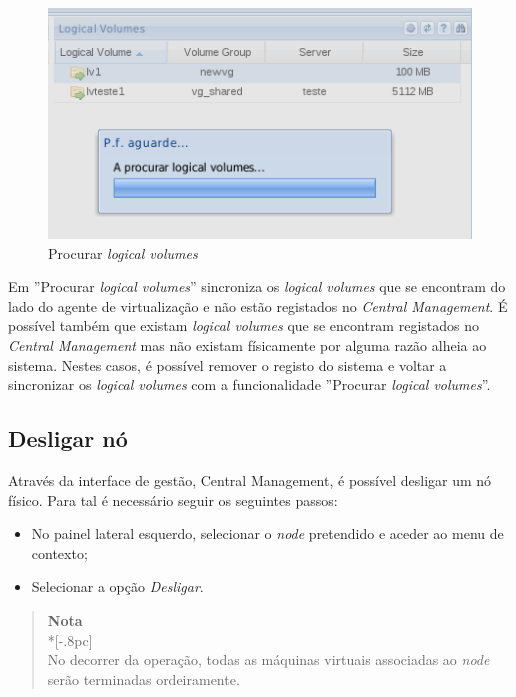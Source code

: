 \begin{figure}[H]
        \begin{center}
        \includegraphics[scale=0.45]{screenshots/node_storage_lv_search.png}
        \caption{Procurar \emph{logical volumes}}
        \label{fig:storage_lv_search}
        \end{center}
\end{figure}

Em ''Procurar \emph{logical volumes}'' sincroniza os \emph{logical volumes} que se encontram do lado do agente de virtualização e não estão registados no \emph{Central Management}.
É possível também que existam \emph{logical volumes} que se encontram registados no \emph{Central Management} mas não existam físicamente por alguma razão alheia ao sistema. 
Nestes casos, é possível remover o registo do sistema e voltar a sincronizar os \emph{logical volumes} com a funcionalidade ''Procurar \emph{logical volumes}''.

\subsection{Desligar nó}
\label{sub:desligar_no}
Através da interface de gestão, Central Management, é possível desligar um nó físico. Para tal é necessário seguir os seguintes passos:

\begin{itemize}
\item No painel lateral esquerdo, selecionar o \textit{node} pretendido e aceder ao menu de contexto;
\item Selecionar a opção \textit{Desligar}.
\end{itemize}

\begin{quote}
    {\large \bf Nota} \\*[-.8pc]
    \underline{\hspace{6in}} \\
    No decorrer da operação, todas as máquinas virtuais associadas ao \textit{node} serão terminadas ordeiramente.
\end{quote}



